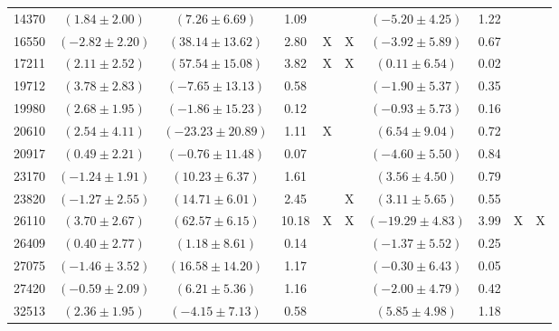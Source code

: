 \documentclass [10pt, twoside] {uwthesis}[2012/04/02]
\begin{document}
{\begin{longtable}[t]{|c|c|cccc|cccc|}
14370	&  $(	1.84	  \pm  	2.00	)$  &  $(	7.26	  \pm  	6.69	)$  &  	1.09	  &  		  &  		  &  $(	-5.20	  \pm  	4.25	)$  &  	1.22	  &  		  &  		  \\
16550	&  $(	-2.82	  \pm  	2.20	)$  &  $(	38.14	  \pm  	13.62	)$  &  	2.80	  &  	X	  &  	X	  &  $(	-3.92	  \pm  	5.89	)$  &  	0.67	  &  		  &  		  \\
17211	&  $(	2.11	  \pm  	2.52	)$  &  $(	57.54	  \pm  	15.08	)$  &  	3.82	  &  	X	  &  	X	  &  $(	0.11	  \pm  	6.54	)$  &  	0.02	  &  		  &  		  \\
19712	&  $(	3.78	  \pm  	2.83	)$  &  $(	-7.65	  \pm  	13.13	)$  &  	0.58	  &  		  &  		  &  $(	-1.90	  \pm  	5.37	)$  &  	0.35	  &  		  &  		  \\
19980	&  $(	2.68	  \pm  	1.95	)$  &  $(	-1.86	  \pm  	15.23	)$  &  	0.12	  &  		  &  		  &  $(	-0.93	  \pm  	5.73	)$  &  	0.16	  &  		  &  		  \\
20610	&  $(	2.54	  \pm  	4.11	)$  &  $(	-23.23	  \pm  	20.89	)$  &  	1.11	  &  	X	  &  		  &  $(	6.54	  \pm  	9.04	)$  &  	0.72	  &  		  &  		  \\
20917	&  $(	0.49	  \pm  	2.21	)$  &  $(	-0.76	  \pm  	11.48	)$  &  	0.07	  &  		  &  		  &  $(	-4.60	  \pm  	5.50	)$  &  	0.84	  &  		  &  		  \\
23170	&  $(	-1.24	  \pm  	1.91	)$  &  $(	10.23	  \pm  	6.37	)$  &  	1.61	  &  		  &  		  &  $(	3.56	  \pm  	4.50	)$  &  	0.79	  &  		  &  		  \\
23820	&  $(	-1.27	  \pm  	2.55	)$  &  $(	14.71	  \pm  	6.01	)$  &  	2.45	  &  		  &  	X	  &  $(	3.11	  \pm  	5.65	)$  &  	0.55	  &  		  &  		  \\
26110	&  $(	3.70	  \pm  	2.67	)$  &  $(	62.57	  \pm  	6.15	)$  &  	10.18	  &  	X	  &  	X	  &  $(	-19.29	  \pm  	4.83	)$  &  	3.99	  &  	X	  &  	X	  \\
26409	&  $(	0.40	  \pm  	2.77  )$  &    $(   1.18	  \pm  	8.61	)$  &  	0.14	  &  		  &  		  &  $(	-1.37	  \pm  	5.52	)$  &  	0.25	  &  		  &  		  \\
27075	&  $(	-1.46	  \pm  	3.52	)$  &  $(	16.58	  \pm  	14.20	)$  &  	1.17	  &  		  &  		  &  $(	-0.30	  \pm  	6.43	)$  &  	0.05	  &  		  &  		  \\
27420	&  $(	-0.59	  \pm  	2.09	)$  &  $(	6.21	  \pm  	5.36	)$  &  	1.16	  &  		  &  		  &  $(	-2.00	  \pm  	4.79	)$  &  	0.42	  &  		  &  		  \\
32513	&  $(	2.36	  \pm  	1.95	)$  &  $(	-4.15	  \pm  	7.13	)$  &  	0.58	  &  		  &  		  &  $(	5.85	  \pm  	4.98	)$  &  	1.18	  &  		  &  		  \\

\end{longtable}}
\end{document}
